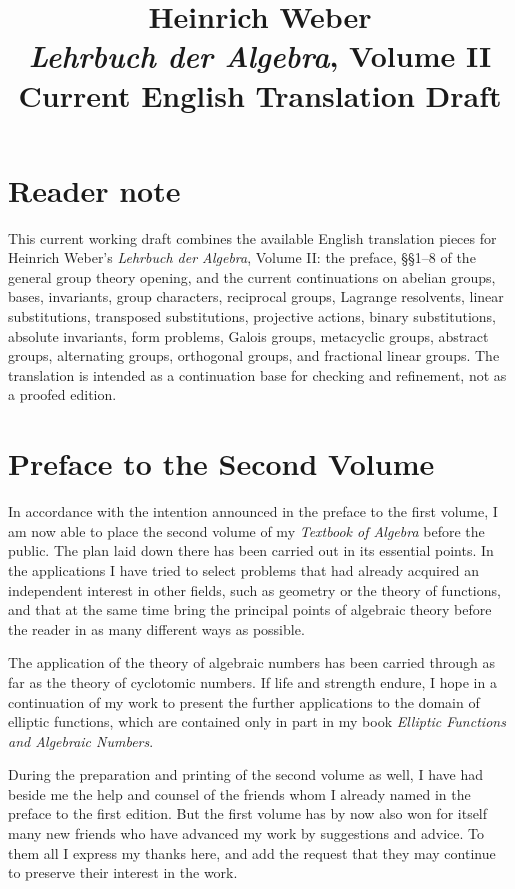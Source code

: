 \documentclass[11pt]{article}
\title{Heinrich Weber\\\textit{Lehrbuch der Algebra}, Volume II\\Current English Translation Draft}
\author{}
\date{}
\begin{document}
\maketitle

\section*{Reader note}
This current working draft combines the available English translation pieces for Heinrich Weber's \emph{Lehrbuch der Algebra}, Volume II: the preface, \S\S 1--8 of the general group theory opening, and the current continuations on abelian groups, bases, invariants, group characters, reciprocal groups, Lagrange resolvents, linear substitutions, transposed substitutions, projective actions, binary substitutions, absolute invariants, form problems, Galois groups, metacyclic groups, abstract groups, alternating groups, orthogonal groups, and fractional linear groups.
The translation is intended as a continuation base for checking and refinement, not as a proofed edition.

\section*{Preface to the Second Volume}
In accordance with the intention announced in the preface to the first volume, I am now able to place the second volume of my \emph{Textbook of Algebra} before the public. The plan laid down there has been carried out in its essential points. In the applications I have tried to select problems that had already acquired an independent interest in other fields, such as geometry or the theory of functions, and that at the same time bring the principal points of algebraic theory before the reader in as many different ways as possible.

The application of the theory of algebraic numbers has been carried through as far as the theory of cyclotomic numbers. If life and strength endure, I hope in a continuation of my work to present the further applications to the domain of elliptic functions, which are contained only in part in my book \emph{Elliptic Functions and Algebraic Numbers}.

During the preparation and printing of the second volume as well, I have had beside me the help and counsel of the friends whom I already named in the preface to the first edition. But the first volume has by now also won for itself many new friends who have advanced my work by suggestions and advice. To them all I express my thanks here, and add the request that they may continue to preserve their interest in the work.
\end{document}
